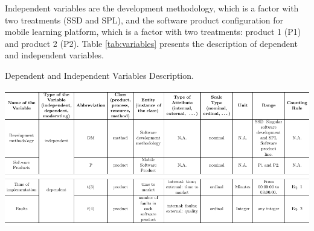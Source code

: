 Independent variables are the development methodology, which is a factor with two treatments (SSD and SPL), and the software product configuration for mobile learning platform, which is a factor with two treatments: product 1 (P1) and product 2 (P2). Table \ref{tab:variables} presents the description of dependent and independent variables.


\begin{table}[h]
\caption{\label{tab:variables}Dependent and Independent Variables Description.}
\centering
\includegraphics[scale=0.85]{figures/section4/tab_n.pdf}




\end{table}
